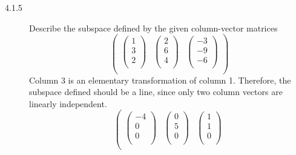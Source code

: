 \documentclass[times, 12pt]{article}
\begin{document}
\begin{description}
\item[4.1.5] Describe the subspace defined by the given column-vector matrices\\[1cm]
$$\left(
  \begin{array}{ccc}
    \left(
       \begin{array}{c}
         1 \\
         3 \\
         2 \\
       \end{array}
     \right)
     & \left(
          \begin{array}{c}
            2 \\
            6 \\
            4 \\
          \end{array}
        \right)
      & \left(
          \begin{array}{c}
            -3 \\
            -9 \\
            -6 \\
          \end{array}
        \right)
       \\
  \end{array}
\right)$$ Column 3 is an elementary transformation of column 1.
Therefore, the subspace defined should be a line, since only two
column vectors are linearly independent.
$$\left(
  \begin{array}{ccc}
    \left(
       \begin{array}{c}
         -4 \\
         0 \\
         0 \\
       \end{array}
     \right)
     & \left(
          \begin{array}{c}
            0 \\
            5 \\
            0 \\
          \end{array}
        \right)
      & \left(
          \begin{array}{c}
            1 \\
            1 \\
            0 \\
          \end{array}
        \right)
       \\

\end{array}$$
\end{description}
\end{document}
